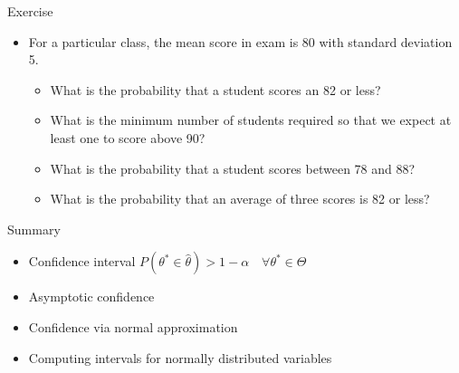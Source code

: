 \documentclass{beamer}
\begin{document}
\begin{frame}{Exercise} 
\begin{itemize} 
 \item For a particular class, the mean score in exam is 80 with standard deviation 5. 
 \begin{itemize}
 \item What is the probability that a student scores an 82 or less? 
 \item What is the minimum number of students required so that we expect at least one to score above 90? 
 \item What is the probability that a student scores between 78 and 88?
 \item What is the probability that an average of three scores is 82 or less?
 \end{itemize} 
\end{itemize}
\end{frame}



\begin{frame}{Summary}
\begin{itemize} 
 \item Confidence interval  $P(\theta^* \in \hat{\theta}) > 1 - \alpha \quad \forall \theta^* \in \Theta $
 \item Asymptotic confidence 
 \item Confidence via normal approximation
 \item Computing intervals for normally distributed variables 
\end{itemize}
\end{frame}
\end{document}

